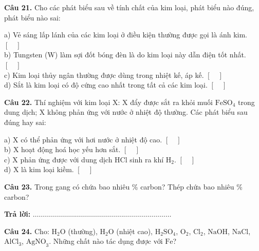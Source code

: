 \documentclass{article}
\begin{document}
\fontsize{26}{34}\selectfont
\textbf{Câu 21.} Cho các phát biểu sau về tính chất của kim loại, phát biểu nào đúng, phát biểu nào sai:
\vspace{12pt}

a) Vẻ sáng lấp lánh của các kim loại ở điều kiện thường được gọi là ánh kim. \hfill $[\quad]$\\[8pt]
b) Tungsten (W) làm sợi đốt bóng đèn là do kim loại này dẫn điện tốt nhất. \hfill $[\quad]$\\[8pt]
c) Kim loại thủy ngân thường được dùng trong nhiệt kế, áp kế. \hfill $[\quad]$\\[8pt]
d) Sắt là kim loại có độ cứng cao nhất trong tất cả các kim loại. \hfill $[\quad]$

\vspace*{\fill}
\newpage

\fontsize{25}{33}\selectfont
\textbf{Câu 22.} Thí nghiệm với kim loại X: X đẩy được sắt ra khỏi muối $\text{FeSO}_4$ trong dung dịch; X không phản ứng với nước ở nhiệt độ thường. Các phát biểu sau đúng hay sai:
\vspace{12pt}

a) X có thể phản ứng với hơi nước ở nhiệt độ cao. \hfill $[\quad]$\\[8pt]
b) X hoạt động hoá học yếu hơn sắt. \hfill $[\quad]$\\[8pt]
c) X phản ứng được với dung dịch $\text{HCl}$ sinh ra khí $\text{H}_2$. \hfill $[\quad]$\\[8pt]
d) X là kim loại kiềm. \hfill $[\quad]$

\vspace*{\fill}
\newpage

\fontsize{26}{34}\selectfont
\textbf{Câu 23.} Trong gang có chứa bao nhiêu \% carbon? Thép chứa bao nhiêu \% carbon?
\vspace{8pt}

\textbf{Trả lời:} $\dots\dots\dots\dots\dots\dots\dots\dots\dots\dots\dots\dots\dots\dots\dots\dots\dots\dots\dots\dots\dots\dots\dots$

\vspace*{\fill}

\textbf{Câu 24.} Cho: $\text{H}_2\text{O}$ (thường), $\text{H}_2\text{O}$ (nhiệt cao), $\text{H}_2\text{SO}_4$, $\text{O}_2$, $\text{Cl}_2$, $\text{NaOH}$, $\text{NaCl}$, $\text{AlCl}_3$, $\text{AgNO}_3$. Những chất nào tác dụng được với $\text{Fe}$?
\vspace{8pt}
\end{document}
